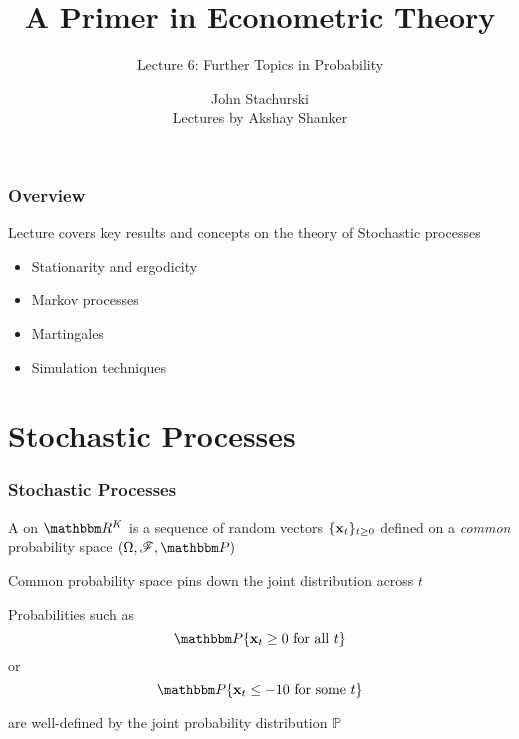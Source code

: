 



\usepackage{listings}


\title{A Primer in Econometric Theory}

\subtitle
{Lecture 6: Further Topics in Probability}

\author{John Stachurski \\ \tiny Lectures by Akshay Shanker}






\begin{frame}
  \titlepage
\end{frame}






\begin{frame}

    \vspace{2em}
    \frametitle{Overview}

    Lecture covers key results and concepts on the theory of Stochastic processes
    
    \begin{itemize}
        \item Stationarity and ergodicity 
        \item Markov processes 
        \item Martingales 
        \item Simulation techniques  
    \end{itemize}
    
\end{frame}

\section{Stochastic Processes}


\begin{frame}

    \vspace{2em}
    \frametitle{Stochastic Processes}
    A  on $\RR^K$ is a
    sequence of random vectors $\{{\mathbf x}_t\}_{t\geq 0}$ defined 
    on a \emph{common} 
    probability space $(\Omega, \fF, \PP)$ 
    
\end{frame}

\begin{frame}

    \vspace{2em}
    Common probability space pins down the joint
    distribution across $t$
    
    Probabilities such as 
    \begin{equation}
        \PP\{\boldx_t \geq 0 \text{ for all } t\}
    \end{equation}
        or 
    \begin{equation}
        \PP\{\boldx_t \leq -10 \text{ for some } t\}
    \end{equation}
    
    are well-defined by the joint probability distribution $\mathbb{P}$

\end{frame}

